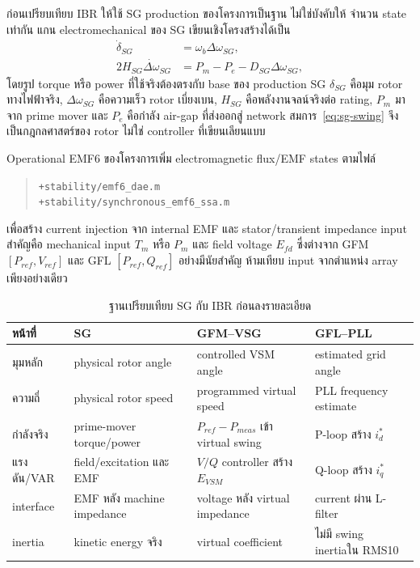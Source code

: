 \documentclass[12pt,a4paper]{article}
\begin{document}
ก่อนเปรียบเทียบ IBR ให้ใช้ SG production ของโครงการเป็นฐาน ไม่ใช่บังคับให้
จำนวน state เท่ากัน แกน electromechanical ของ SG เขียนเชิงโครงสร้างได้เป็น
\begin{align}
\dot\delta_{SG}&=\omega_b\Delta\omega_{SG},\\
2H_{SG}\dot{\Delta\omega}_{SG}
&=P_m-P_e-D_{SG}\Delta\omega_{SG},
\label{eq:sg-swing}
\end{align}
โดยรูป torque หรือ power ที่ใช้จริงต้องตรงกับ base ของ production SG
$\delta_{SG}$ คือมุม rotor ทางไฟฟ้าจริง, $\Delta\omega_{SG}$ คือความเร็ว rotor เบี่ยงเบน,
$H_{SG}$ คือพลังงานจลน์จริงต่อ rating, $P_m$ มาจาก prime mover และ $P_e$ คือกำลัง
air-gap ที่ส่งออกสู่ network สมการ~\eqref{eq:sg-swing} จึงเป็นกฎกลศาสตร์ของ rotor
ไม่ใช่ controller ที่เขียนเลียนแบบ

Operational EMF6 ของโครงการเพิ่ม electromagnetic flux/EMF states ตามไฟล์
\begin{quote}\small
\nolinkurl{+stability/emf6_dae.m}\\
\nolinkurl{+stability/synchronous_emf6_ssa.m}
\end{quote}
เพื่อสร้าง current injection จาก internal EMF และ stator/transient impedance
input สำคัญคือ mechanical input $T_m$ หรือ $P_m$ และ field voltage $E_{fd}$
ซึ่งต่างจาก GFM $[P_{ref},V_{ref}]$ และ GFL $[P_{ref},Q_{ref}]$ อย่างมีนัยสำคัญ
ห้ามเทียบ input จากตำแหน่ง array เพียงอย่างเดียว

\begin{table}[H]\centering
\caption{ฐานเปรียบเทียบ SG กับ IBR ก่อนลงรายละเอียด}\label{tab:sg-base-compare}
\begin{tabularx}{\textwidth}{p{}XXX}
\toprule
หน้าที่ & SG & GFM--VSG & GFL--PLL \\ \midrule
มุมหลัก & physical rotor angle & controlled VSM angle & estimated grid angle \\
ความถี่ & physical rotor speed & programmed virtual speed & PLL frequency estimate \\
กำลังจริง & prime-mover torque/power & $P_{ref}-P_{meas}$ เข้า virtual swing & P-loop สร้าง $i_d^*$ \\
แรงดัน/VAR & field/excitation และ EMF & $V/Q$ controller สร้าง $E_{VSM}$ & Q-loop สร้าง $i_q^*$ \\
interface & EMF หลัง machine impedance & voltage หลัง virtual impedance & current ผ่าน L-filter \\
inertia & kinetic energy จริง & virtual coefficient & ไม่มี swing inertiaใน RMS10 \\
\bottomrule
\end{tabularx}
\end{table}
\end{document}
